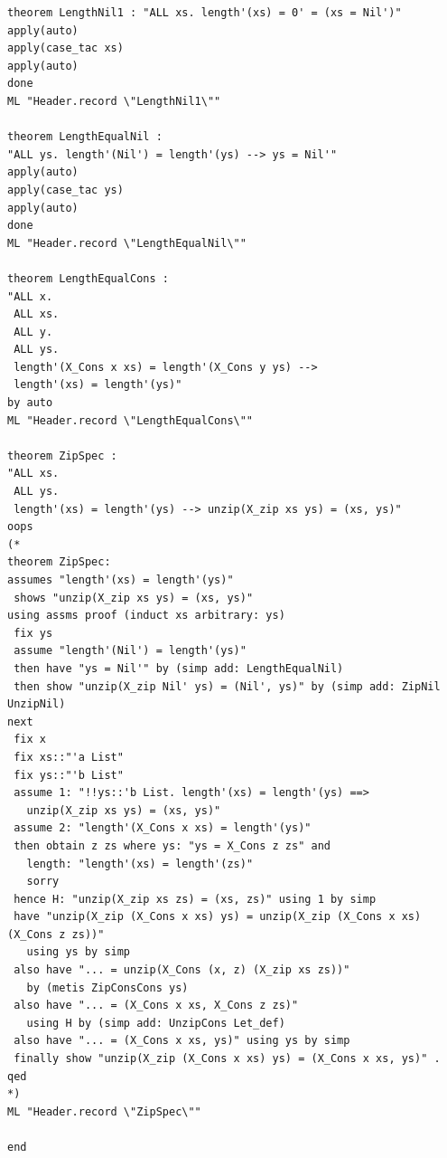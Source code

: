 \documentclass[12pt,twoside]{article}
\numberwithin{spec}{subsection}
\numberwithin{proof}{subsection}
\numberwithin{figure}{subsection}
\numberwithin{code}{subsection}
\begin{document}
\begin{multicols}{2}
\begin{verbatim}
theorem LengthNil1 : "ALL xs. length'(xs) = 0' = (xs = Nil')"
apply(auto)
apply(case_tac xs)
apply(auto)
done
ML "Header.record \"LengthNil1\""

theorem LengthEqualNil :
"ALL ys. length'(Nil') = length'(ys) --> ys = Nil'"
apply(auto)
apply(case_tac ys)
apply(auto)
done
ML "Header.record \"LengthEqualNil\""

theorem LengthEqualCons :
"ALL x.
 ALL xs.
 ALL y.
 ALL ys.
 length'(X_Cons x xs) = length'(X_Cons y ys) -->
 length'(xs) = length'(ys)"
by auto
ML "Header.record \"LengthEqualCons\""

theorem ZipSpec :
"ALL xs.
 ALL ys.
 length'(xs) = length'(ys) --> unzip(X_zip xs ys) = (xs, ys)"
oops
(*
theorem ZipSpec:
assumes "length'(xs) = length'(ys)"
 shows "unzip(X_zip xs ys) = (xs, ys)"
using assms proof (induct xs arbitrary: ys)
 fix ys
 assume "length'(Nil') = length'(ys)"
 then have "ys = Nil'" by (simp add: LengthEqualNil)
 then show "unzip(X_zip Nil' ys) = (Nil', ys)" by (simp add: ZipNil UnzipNil)
next
 fix x
 fix xs::"'a List"
 fix ys::"'b List"
 assume 1: "!!ys::'b List. length'(xs) = length'(ys) ==>
   unzip(X_zip xs ys) = (xs, ys)"
 assume 2: "length'(X_Cons x xs) = length'(ys)"
 then obtain z zs where ys: "ys = X_Cons z zs" and
   length: "length'(xs) = length'(zs)"
   sorry
 hence H: "unzip(X_zip xs zs) = (xs, zs)" using 1 by simp
 have "unzip(X_zip (X_Cons x xs) ys) = unzip(X_zip (X_Cons x xs) (X_Cons z zs))"
   using ys by simp
 also have "... = unzip(X_Cons (x, z) (X_zip xs zs))"
   by (metis ZipConsCons ys)
 also have "... = (X_Cons x xs, X_Cons z zs)"
   using H by (simp add: UnzipCons Let_def)
 also have "... = (X_Cons x xs, ys)" using ys by simp
 finally show "unzip(X_zip (X_Cons x xs) ys) = (X_Cons x xs, ys)" .
qed
*)
ML "Header.record \"ZipSpec\""

end
\end{verbatim}
\end{multicols}
\end{document}
